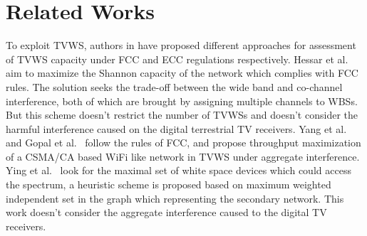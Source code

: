 \documentclass[times]{ettauth}
\theoremstyle{mytheoremstyle}
\theoremstyle{mytheoremstyle}
\theoremstyle{mytheoremstyle}
\begin{document}


\section{Related Works}
\label{decomposition_relatedwork}




To exploit TVWS, authors in \cite{DySpAN10MeasuringWhitespaceCapacity, HessarTMC15, Deshmukh2015, Achtzehn12} have proposed different approaches for assessment of TVWS capacity under FCC and ECC regulations respectively.
Hessar et al.~\cite{ReAlloTVWS14DySPAN} aim to maximize the Shannon capacity of the network which complies with FCC rules.
The solution seeks the trade-off between the wide band and co-channel interference, both of which are brought by assigning multiple channels to WBSs.
But this scheme doesn't restrict the number of TVWSs and doesn't consider the harmful interference caused on the digital terrestrial TV receivers.
Yang et al.~\cite{yang2013WiFiWSTVCapacity} and Gopal et al.~\cite{gopalTCCN16} follow the rules of FCC, and propose throughput maximization of a CSMA/CA based WiFi like network in TVWS under aggregate interference.
Ying et al.~\cite{Ying2018DySPAN} look for the maximal set of white space devices which could access the spectrum, a heuristic scheme is proposed based on maximum weighted independent set in the graph which representing the secondary network.
This work doesn't consider the aggregate interference caused to the digital TV receivers.
\end{document}

